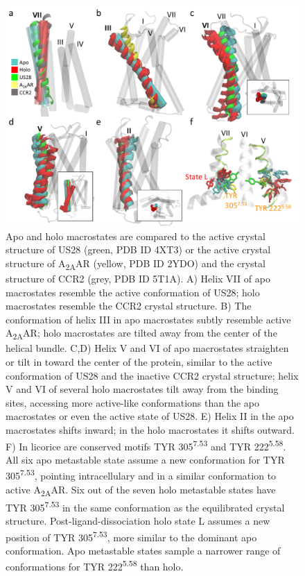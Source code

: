 \documentclass[9pt,twocolumn,twoside]{pnas-new}
\begin{document}
\begin{figure}
\centering
\includegraphics[width=11.4cm]{global_tm.pdf}
\caption{Apo and holo macrostates are compared to the active crystal structure of US28 (green, PDB ID 4XT3) or the active crystal structure of A\textsubscript{2A}AR (yellow, PDB ID 2YDO) and the crystal structure of CCR2 (grey, PDB ID 5T1A). A) Helix VII of apo macrostates resemble the active conformation of US28; holo macrostates resemble the CCR2 crystal structure. B) The conformation of helix III in apo macrostates subtly resemble active A\textsubscript{2A}AR; holo macrostates are tilted away from the center of the helical bundle. C,D) Helix V and VI of apo macrostates straighten or tilt in toward the center of the protein, similar to the active conformation of US28 and the inactive CCR2 crystal structure; helix V and VI of several holo macrostates tilt away from the binding sites, accessing more active-like conformations than the apo macrostates or even the active state of US28. E) Helix II in the apo macrostates shifts inward; in the holo macrostates it shifts outward. F) In licorice are conserved motifs TYR 305\textsuperscript{7.53} and TYR 222\textsuperscript{5.58}. All six apo metastable state assume a new conformation for TYR 305\textsuperscript{7.53}, pointing intracellulary and in a similar conformation to active A\textsubscript{2A}AR. Six out of the seven holo metastable states have TYR 305\textsuperscript{7.53} in the same conformation as the equilibrated crystal structure. Post-ligand-dissociation holo state L assumes a new position of TYR 305\textsuperscript{7.53}, more similar to the dominant apo conformation. Apo metastable states sample a narrower range of conformations for TYR 222\textsuperscript{5.58} than holo.}
\label{fig:global_tm}
\end{figure}
\end{document}
